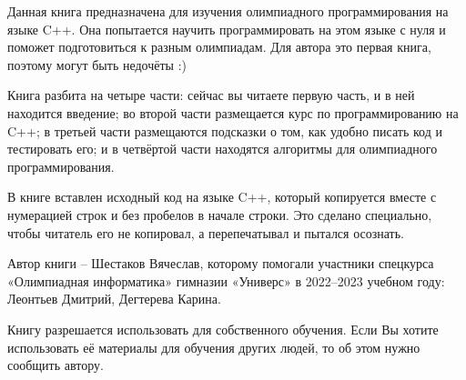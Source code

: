 Данная книга предназначена для изучения олимпиадного программирования на языке C++. Она попытается научить программировать на этом языке с нуля и поможет подготовиться к разным олимпиадам. Для автора это первая книга, поэтому могут быть недочёты :)

Книга разбита на четыре части: сейчас вы читаете первую часть, и в ней находится введение; во второй части размещается курс по программированию на C++; в третьей части размещаются подсказки о том, как удобно писать код и тестировать его; и в четвёртой части находятся алгоритмы для олимпиадного программирования.

В книге вставлен исходный код на языке C++, который копируется вместе с нумерацией строк и без пробелов в начале строки. Это сделано специально, чтобы читатель его не копировал, а перепечатывал и пытался осознать.

Автор книги – Шестаков Вячеслав, которому помогали участники спецкурса «Олимпиадная информатика» гимназии «Универс» в 2022–2023 учебном году: Леонтьев Дмитрий, Дегтерева Карина.

Книгу разрешается использовать для собственного обучения. Если Вы хотите использовать её материалы для обучения других людей, то об этом нужно сообщить автору.
